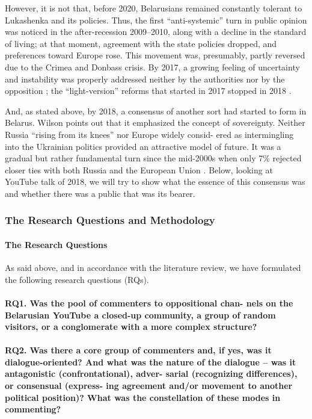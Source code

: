 However, it is not that, before 2020, Belarusians remained constantly tolerant to Lukashenka and its policies. Thus, the first “anti-systemic” turn in public opinion was noticed in the after-recession 2009–2010, along with a decline in the standard of living; at that moment, agreement with the state policies dropped, and preferences toward Europe rose. This movement was, presumably, partly reversed due to the Crimea and Donbass crisis. By 2017, a growing feeling of uncertainty and instability was properly addressed neither by the authorities nor by the opposition \cite{Manaev2017}; the “light-version” reforms that started in 2017 stopped in 2018 \cite{BelarusianYearbook}.

And, as stated above, by 2018, a consensus of another sort had started to form in Belarus. Wilson \cite{Wilson} points out that it emphasized the concept of sovereignty. Neither Russia “rising from its knees” nor Europe widely consid- ered as intermingling into the Ukrainian politics provided an attractive model of future. It was a gradual but rather fundamental turn since the mid-2000s when only 7\% rejected closer ties with both Russia and the European Union \cite[p.~225]{RontoyanniKorosteleva}. Below, looking at YouTube talk of 2018, we will try to show what the essence of this consensus was and whether there was a public that was its bearer.

\subsubsection{The Research Questions and Methodology}

\paragraph{The Research Questions}
As said above, and in accordance with the literature review, we have formulated the following research questions (RQs).

\paragraph{RQ1. Was the pool of commenters to oppositional chan- nels on the Belarusian YouTube a closed-up community, a group of random visitors, or a conglomerate with a more complex structure?}

\paragraph{RQ2. Was there a core group of commenters and, if yes, was it dialogue-oriented? And what was the nature of the dialogue -- was it antagonistic (confrontational), adver- sarial (recognizing differences), or consensual (express- ing agreement and/or movement to another political position)? What was the constellation of these modes in commenting?}


